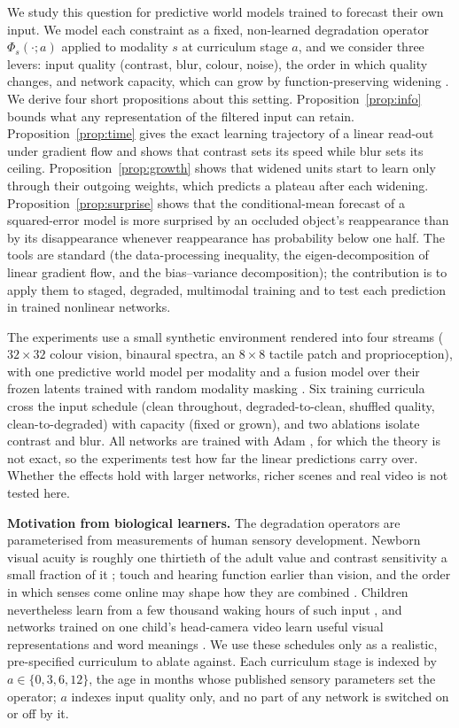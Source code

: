 \documentclass{article}
\theoremstyle{plain}
\theoremstyle{remark}
\begin{document}
We study this question for predictive world models trained to forecast their own input. We model each constraint as a fixed, non-learned degradation operator \(\Phi_s(\cdot;a)\) applied to modality \(s\) at curriculum stage \(a\), and we consider three levers: input quality (contrast, blur, colour, noise), the order in which quality changes, and network capacity, which can grow by function-preserving widening \autocite{chen2016net2net}. We derive four short propositions about this setting. Proposition~\ref{prop:info} bounds what any representation of the filtered input can retain. Proposition~\ref{prop:time} gives the exact learning trajectory of a linear read-out under gradient flow and shows that contrast sets its speed while blur sets its ceiling. Proposition~\ref{prop:growth} shows that widened units start to learn only through their outgoing weights, which predicts a plateau after each widening. Proposition~\ref{prop:surprise} shows that the conditional-mean forecast of a squared-error model is more surprised by an occluded object's reappearance than by its disappearance whenever reappearance has probability below one half. The tools are standard (the data-processing inequality, the eigen-decomposition of linear gradient flow, and the bias--variance decomposition); the contribution is to apply them to staged, degraded, multimodal training and to test each prediction in trained nonlinear networks.

The experiments use a small synthetic environment rendered into four streams (\(32\times32\) colour vision, binaural spectra, an \(8\times8\) tactile patch and proprioception), with one predictive world model per modality and a fusion model over their frozen latents trained with random modality masking \autocite{neverova2016moddrop}. Six training curricula cross the input schedule (clean throughout, degraded-to-clean, shuffled quality, clean-to-degraded) with capacity (fixed or grown), and two ablations isolate contrast and blur. All networks are trained with Adam \autocite{kingma2015adam}, for which the theory is not exact, so the experiments test how far the linear predictions carry over. Whether the effects hold with larger networks, richer scenes and real video is not tested here.

\textbf{Motivation from biological learners.} The degradation operators are parameterised from measurements of human sensory development. Newborn visual acuity is roughly one thirtieth of the adult value and contrast sensitivity a small fraction of it \autocite{banks1988optical,norcia1985spatial}; touch and hearing function earlier than vision, and the order in which senses come online may shape how they are combined \autocite{turkewitz1982limitations}. Children nevertheless learn from a few thousand waking hours of such input \autocite{smith2018curriculum}, and networks trained on one child's head-camera video learn useful visual representations and word meanings \autocite{orhan2020self,orhan2024learning,vong2024grounded}. We use these schedules only as a realistic, pre-specified curriculum to ablate against. Each curriculum stage is indexed by \(a\in\{0,3,6,12\}\), the age in months whose published sensory parameters set the operator; \(a\) indexes input quality only, and no part of any network is switched on or off by it.
\end{document}
